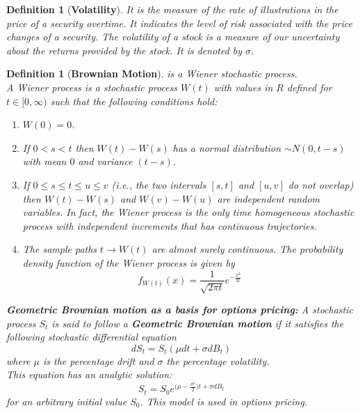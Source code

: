 \documentclass[a4 paper, 12pt]{report}
\theoremstyle{plain}
\newtheorem{definition}[theorem]{\textbf{Definition}}
\begin{document}
\begin{definition}[\textbf{Volatility}]\label{1.2.7}
\normalfont
It is the measure of the rate of illustrations in the price of a security overtime. It indicates the level of risk associated with the price changes of a security. The volatility of a stock is a measure of our uncertainty about the returns provided by the stock. It is denoted by $\sigma$.
\end{definition}

\begin{definition}[\textbf{Brownian Motion}]\label{1.3}
\normalfont
is a Wiener stochastic process.\\

A Wiener process is a stochastic process $W(t)$ with values in $R$ defined for $t \in [0,\infty) $ such that the following conditions hold:
\begin{enumerate}
\item[(1)] $W(0) = 0$.
\item[(2)] If $0 < s < t$ then $W(t)-W(s)$ has a normal distribution $ \sim N(0, t - s)$ with mean $0$ and variance $(t-s)$.
\item[(3)] If $0 \leq  s \leq t \leq u \leq v$ (i.e., the two intervals $[s, t]$ and $[u, v]$ do not overlap) then $W(t)-W(s)$ and $W(v)-W(u)$ are independent random variables. In fact, the Wiener process is the only time homogeneous stochastic process with independent increments that has continuous trajectories.
\item[(4)] The sample paths $t \rightarrow W(t)$ are almost surely continuous. The probability density function of the Wiener process is given by
$$
f_{W(t)}(x) = \frac{1}{\sqrt{2\pi t}}e^{-\frac{x^2}{2t}}
$$
\end{enumerate}
\textbf{Geometric Brownian motion as a basis for options pricing:}
A stochastic process $S_t$ is said to follow a \textbf{Geometric Brownian motion} if it satisfies the following stochastic differential equation
$$
dS_t = S_t(\mu dt+\sigma dB_t)
$$
where $\mu$ is the percentage drift and $\sigma$ the percentage volatility.\\
This equation has an analytic solution:
$$
S_t = S_0e^{\bigg(\mu - \frac{\sigma^2}{2}\bigg)t+\sigma dB_t}
$$
for an arbitrary initial value $S_0$. This model is used in options pricing.

\end{definition}
\end{document}
